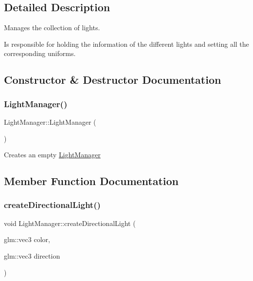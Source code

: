 \subsection{Detailed Description}
Manages the collection of lights. 

Is responsible for holding the information of the different lights and setting all the corresponding uniforms. 

\subsection{Constructor \& Destructor Documentation}
\mbox{\label{class_light_manager_a1eee8eb276ec7f041d961a567389754a}} 
\subsubsection{\texorpdfstring{LightManager()}{LightManager()}}
{\footnotesize\ttfamily Light\+Manager\+::\+Light\+Manager (\begin{DoxyParamCaption}{ }\end{DoxyParamCaption})}

Creates an empty \mbox{\hyperlink{class_light_manager}{Light\+Manager}} 

\subsection{Member Function Documentation}
\mbox{\label{class_light_manager_a4c9bb6347e3d2ef437a5b8ad8cba86d2}} 
\subsubsection{\texorpdfstring{createDirectionalLight()}{createDirectionalLight()}}
{\footnotesize\ttfamily void Light\+Manager\+::create\+Directional\+Light (\begin{DoxyParamCaption}\item[{glm\+::vec3}]{color,  }\item[{glm\+::vec3}]{direction }\end{DoxyParamCaption})}

